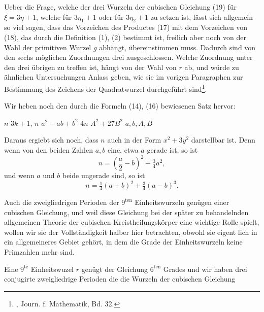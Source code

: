 Ueber die Frage, welche der drei Wurzeln der cubischen
Gleichung (19) für $\xi = 3\eta + 1$, welche für $3\eta_1 + 1$ oder für
$3\eta_2 + 1$ zu setzen ist, lässt sich allgemein so viel sagen, dass
das Vorzeichen des Productes (17) mit dem Vorzeichen von (18),
das durch die Definition (1), (2) bestimmt ist, freilich aber noch
von der Wahl der primitiven Wurzel $g$ abhängt, übereinstimmen
muss. Dadurch sind von den sechs möglichen Zuordnungen drei
ausgeschlossen. Welche Zuordnung unter den drei übrigen zu
treffen ist, hängt von der Wahl von $r$ ab, und würde zu ähnlichen
Untersuchungen Anlass geben, wie sie im vorigen Paragraphen zur
Bestimmung des Zeichens der Quadratwurzel durchgeführt sind\footnote{, Journ. f. Mathematik, Bd. 32.}.

Wir heben noch den durch die Formeln (14), (16) bewiesenen
Satz hervor:

 $n$  $3k + 1$,  $n$
 $a^2 - ab + b^2$  $4n$ 
$A^2 + 27B^2$  $a, b, A, B$ 

Daraus ergiebt sich noch, dass $n$ auch in der Form $x^2 + 3y^2$
darstellbar ist. Denn wenn von den beiden Zahlen $a, b$ eine,
etwa $a$ gerade ist, so ist
\[
n = \left(\frac{a}{2} - b\right)^2 + \tfrac{3}{4}a^2,
\]
und wenn $a$ und $b$ beide ungerade sind, so ist
\[
n = \tfrac{1}{4}(a + b)^2 + \tfrac{3}{4}(a - b)^3. %
\]

Auch die zweigliedrigen Perioden der $9^{\mathrm{ten}}$ Einheitswurzeln
genügen einer cubischen Gleichung, und weil diese Gleichung
bei der später zu behandelnden allgemeinen Theorie der cubischen
Kreistheilungskörper eine wichtige Rolle spielt, wollen wir
sie der Vollständigkeit halber hier betrachten, obwohl sie eigent\-
lich in ein allgemeineres Gebiet gehört, in dem die Grade der
Einheitswurzeln keine Primzahlen mehr sind.

Eine $9^{\mathrm{te}}$ Einheitswuzel $r$ genügt der Gleichung $6^{\mathrm{ten}}$ Grades %
und wir haben drei conjugirte zweigliedrige Perioden
die die Wurzeln der cubischen Gleichung
